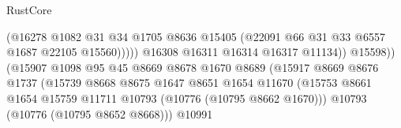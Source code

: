 \begin{lexlean}{RustCore}
\begin{coremodule}
                                                  (@16278
                                                    @1082
                                                    @31
                                                    @34
                                                    @1705
                                                    @8636
                                                    @15405
                                                    (@22091
                                                      @66
                                                      @31
                                                      @33
                                                      @6557
                                                      @1687
                                                      @22105
                                                      @15560)))))
                                            @16308
                                            @16311
                                            @16314
                                            @16317
                                            @11134))
                                        @15598))
                                    (@15907
                                      @1098
                                      @95
                                      @45
                                      @8669
                                      @8678
                                      @1670
                                      @8689
                                      (@15917
                                        @8669
                                        @8676
                                        @1737
                                        (@15739
                                          @8668
                                          @8675
                                          @1647
                                          @8651
                                          @1654
                                          @11670
                                          (@15753
                                            @8661
                                            @1654
                                            @15759
                                            @11711
                                            @10793
                                            (@10776 (@10795 @8662 @1670)))
                                          @10793
                                          (@10776 (@10795 @8652 @8668)))
                                        @10991

\end{coremodule}
\end{lexlean}
